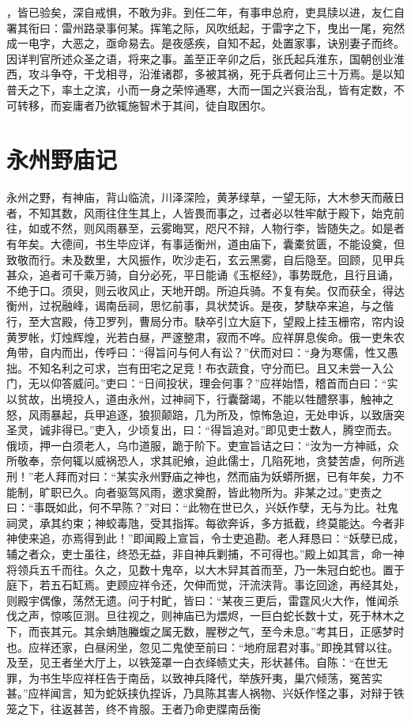 \documentclass[a4paper,12pt,UTF8,twoside]{ctexbook}
\begin{document}
，皆已验矣，深自戒惧，不敢为非。到任二年，有事申总府，吏具牍以进，友仁自署其衔曰：雷州路录事何某。挥笔之际，风吹纸起，于雷字之下，曳出一尾，宛然成一电字，大恶之，亟命易去。是夜感疾，自知不起，处置家事，诀别妻子而终。因详判官所述众圣之语，将来之事。盖至正辛卯之后，张氏起兵淮东，国朝创业淮西，攻斗争夺，干戈相寻，沿淮诸郡，多被其祸，死于兵者何止三十万焉。是以知普夭之下，率土之滨，小而一身之荣悴通寒，大而一国之兴衰治乱，皆有定数，不可转移，而妄庸者乃欲辄施智术于其间，徒自取困尔。 

\chapter{永州野庙记}

永州之野，有神庙，背山临流，川泽深险，黄茅绿草，一望无际，大木参天而蔽日者，不知其数，风雨往住生其上，人皆畏而事之，过者必以牲牢献于殿下，始克前往，如或不然，则风雨暴至，云雾晦冥，咫尺不辩，人物行李，皆随失之。如是者有年矣。大德间，书生毕应详，有事适衡州，道由庙下，囊橐贫匮，不能设奠，但致敬而行。未及数里，大风振作，吹沙走石，玄云黑雾，自后隐至。回顾，见甲兵甚众，追者可千乘万骑，自分必死，平日能诵《玉枢经》，事势既危，且行且诵，不绝于口。须臾，则云收风止，天地开朗。所迫兵骑。不复有矣。仅而获全，得达衡州，过祝融峰，谒南岳祠，思忆前事，具状焚诉。是夜，梦駃卒来追，与之偕行，至大宫殿，侍卫罗列，曹局分市。駃卒引立大庭下，望殿上挂玉栅帘，帘内设黄罗帐，灯烛辉煌，光若白昼，严邃整肃，寂而不哗。应祥屏息俟命。俄一吏朱农角带，自内而出，传呼曰：“得旨问与何人有讼？”伏而对曰：“身为寒儒，性又愚拙。不知名利之可求，岂有田宅之足竞！布衣蔬食，守分而巳。且又未尝一入公门，无以仰答威问。”吏曰：“日间投状，理会何事？”应祥始悟，稽首而白曰：“实以贫故，出境投人，道由永州，过神祠下，行囊罄竭，不能以牲醴祭事，触神之怒，风雨暴起，兵甲追逐，狼狈颠踣，几为所及，惊怖急迫，无处申诉，以致唐突圣灵，诚非得已。”吏入，少顷复出，曰：“得旨追对。”即见吏士数人，腾空而去。俄顷，押一白须老人，乌巾道服，跪于阶下。吏宣旨诘之曰：“汝为一方神祗，众所敬奉，奈何辄以威祸恐人，求其祀飨，迫此儒士，几陷死地，贪婪苦虐，何所逃刑！”老人拜而对曰：“某实永州野庙之神也，然而庙为妖蟒所据，已有年矣，力不能制，旷职已久。向者驱驾风雨，邀求奠酹，皆此物所为。非某之过。”吏责之曰：“事既如此，何不早陈？”对曰：“此物在世已久，兴妖作孽，无与为比。社鬼祠灵，承其约束；神蛟毒虺，受其指挥。每欲奔诉，多方抵截，终莫能达。今者非神使来追，亦焉得到此！”即闻殿上宣旨，令士吏追勘。老人拜恳曰：“妖孽已成，辅之者众，吏士虽往，终恐无益，非自神兵剿捕，不可得也。”殿上如其言，命一神将领兵五千而往。久之，见数十鬼卒，以大木舁其首而至，乃一朱冠白蛇也。置于庭下，若五石缸焉。吏顾应祥令还，欠伸而觉，汗流浃背。事讫回途，再经其处，则殿宇偶像，荡然无遗。问于村甿，皆曰：“某夜三更后，雷霆风火大作，惟闻杀伐之声，惊咳叵测。旦往视之，则神庙已为煨烬，一巨白蛇长数十丈，死于林木之下，而丧其元。其余蚺虺螣蝮之属无数，腥秽之气，至今未息。”考其日，正感梦时也。应祥还家，白昼闲坐，忽见二鬼使至前曰：“地府屈君对事。”即挽其臂以往。及至，见王者坐大厅上，以铁笼罩一白衣绎帻丈夫，形状甚伟。自陈：“在世无罪，为书生毕应祥枉告于南岳，以致神兵降代，举族歼夷，巢穴倾荡，冤苦实甚。”应祥闻言，知为蛇妖挟仇捏诉，乃具陈其害人祸物、兴妖作怪之事，对辩于铁笼之下，往返甚苦，终不肯服。王者乃命吏牒南岳衡
\end{document}
